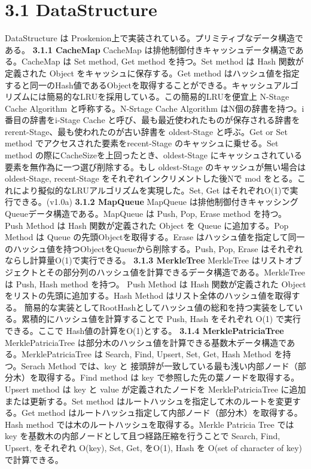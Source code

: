 \hypertarget{datastructure}{%
\section{\texorpdfstring{3.1
\textbf{DataStructure}}{3.1 DataStructure}}\label{datastructure}}

DataStructure は
Proskenion上で実装されている。プリミティブなデータ構造である。
\textbf{3.1.1 CacheMap} CacheMap
は排他制御付きキャッシュデータ構造である。CacheMap は Set method, Get
method を持つ。Set method は Hash 関数が定義された Object
をキャッシュに保存する。Get method
はハッシュ値を指定すると同一のHash値であるObjectを取得することができる。キャッシュアルゴリズムには簡易的なLRUを採用している。この簡易的LRUを便宜上
N-Stage Cache Algorithm と呼称する。N-Srtage Cache Algorithm
はN個の辞書を持つ。i番目の辞書をi-Stage Cache
と呼び、最も最近使われたものが保存される辞書を
rerent-Stage、最も使われたのが古い辞書を oldest-Stage と呼ぶ。Get or Set
method でアクセスされた要素をrecent-Stage のキャッシュに乗せる。Set
method の際にCacheSizeを上回ったとき、oldest-Stage
にキャッシュされている要素を無作為に一つ選び削除する。もし oldest-Stage
のキャッシュが無い場合は oldest-Stage, recent-Stage
をそれぞれインクリメントした後Nで mod
をとる。これにより擬似的なLRUアルゴリズムを実現した。Set, Get
はそれぞれO(1)で実行できる。(v1.0a) \textbf{3.1.2 MapQueue} MapQueue
は排他制御付きキャッシングQueueデータ構造である。MapQueue は Push, Pop,
Erase method を持つ。 Push Method は Hash 関数が定義された Object を
Queue に追加する。Pop Method は Queue の先頭Objectを取得する。Erase
はハッシュ値を指定して同一のハッシュ値を持つObjectをQueueから削除する。Push,
Pop, Erase はそれぞれならし計算量O(1)で実行できる。 \textbf{3.1.3
MerkleTree} MerkleTree
はリストオブジェクトとその部分列のハッシュ値を計算できるデータ構造である。MerkleTree
は Push, Hash method を持つ。 Push Method は Hash 関数が定義された
Object をリストの先頭に追加する。Hash Method
はリスト全体のハッシュ値を取得する。
簡易的な実装としてRootHashとしてハッシュ値の総和を持つ実装をしている。累積的にハッシュ値を計算することで
Push, Hash をそれぞれ O(1) で実行できる。ここで
Hash値の計算をO(1)とする。 \textbf{3.1.4 MerklePatriciaTree}
MerklePatriciaTree
は部分木のハッシュ値を計算できる基数木データ構造である。MerklePatriciaTree
は Search, Find, Upsert, Set, Get, Hash Method を持つ。Serach Method
では、key と
接頭辞が一致している最も浅い内部ノード（部分木）を取得する。Find method
は key で参照した先の葉ノードを取得する。Upsert method は key と value
が定義されたノードを MerklePatriciaTree に追加または更新する。Set method
はルートハッシュを指定して木のルートを変更する。Get method
はルートハッシュ指定して内部ノード（部分木）を取得する。Hash method
では木のルートハッシュを取得する。Merkle Patricia Tree では key
を基数木の内部ノードとして且つ経路圧縮を行うことで Search, Find, Upsert,
をそれぞれ O(\textbar key\textbar), Set, Get, をO(1), Hash を
O(\textbar set of character of key\textbar) で計算できる。

